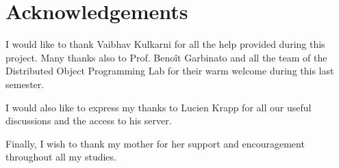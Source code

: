 \documentclass[a4]{article}
\begin{document}

\newpage
\tableofcontents



\newpage
\setcounter{secnumdepth}{0}
\section{Acknowledgements}
\thispagestyle{empty}

I would like to thank Vaibhav Kulkarni for all the help provided during this project. Many thanks also to Prof. Benoît Garbinato and all the team of the Distributed Object Programming Lab for their warm welcome during this last semester. 

I would also like to express my thanks to Lucien Krapp for all our useful discussions and the access to his server. 

Finally, I wish to thank my mother for her support and encouragement throughout all my studies.
\setcounter{secnumdepth}{1}

\newpage
\end{document}
